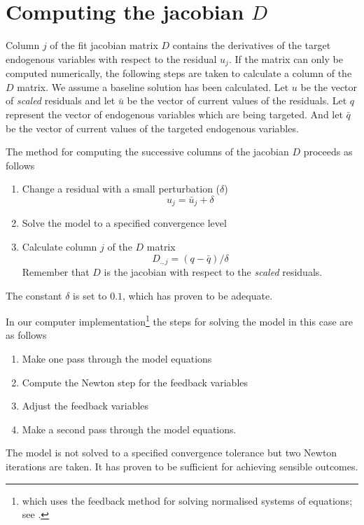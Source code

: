 \documentclass[english,memorandum,old,sectionpage]{cpbart}
\newcommand*{\ubar}{\bar{u}}
\begin{document}
\section{Computing the jacobian $D$}\label{sec:calcD}
Column $j$ of the fit jacobian matrix $D$ contains the derivatives
of the target endogenous variables with respect to the residual $u_j$.
If the matrix can only be computed numerically, the following
steps are taken to calculate a column of the $D$ matrix.
We assume a baseline solution has been calculated.
Let $u$ be the vector of \emph{scaled} residuals and
let $\ubar$ be the vector of current values of
the residuals. Let $q$ represent the vector of endogenous
variables which are being targeted.
And let $\bar{q}$ be the vector of current values of the targeted
endogenous variables.

The method for computing the successive columns of the jacobian $D$
proceeds as follows

\begin{enumerate}
\item Change a residual with a small perturbation ($\delta$)
\begin{displaymath}
u_j = \ubar_j + \delta
\end{displaymath}

\item Solve the model to a specified convergence level
\item Calculate column $j$ of the $D$ matrix
\begin{displaymath}
D_{.,j} = (q - \bar{q})/\delta
\end{displaymath}
Remember that $D$ is the jacobian with respect to the \emph{scaled} residuals.
\end{enumerate}
%
The constant $\delta$ is set to $0.1$, which has proven to be adequate.

In our computer implementation\footnote{which uses the feedback method
for solving normalised systems of equations; see \cite{dongallo}.}
the steps for solving the model in this case are as follows

\begin{enumerate}
\item Make one pass through the model equations
\item Compute the Newton step for the feedback variables
\item Adjust the feedback variables
\item Make a second pass through the model equations.
\end{enumerate}
%
The model is not solved to a specified convergence tolerance but
two Newton iterations are taken.
It has proven to be sufficient for achieving sensible outcomes.
\end{document}
